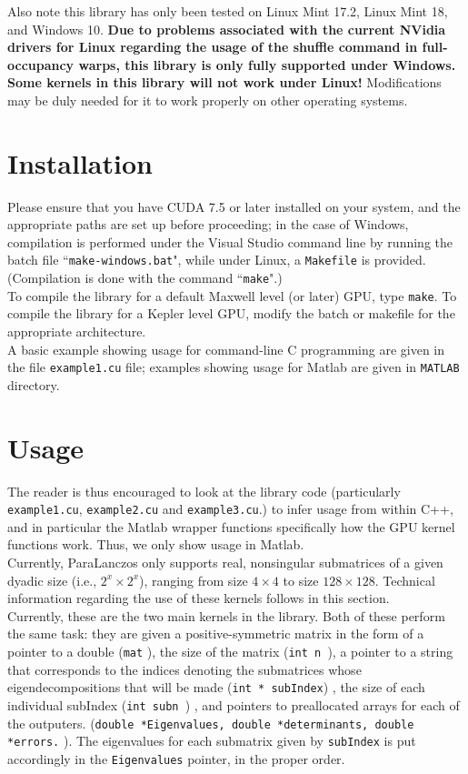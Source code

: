 \documentclass{amsart}
\begin{document}
 Also note this library has only been tested on Linux Mint 17.2, Linux Mint 18, and Windows 10.  \textbf{Due to problems associated with the current NVidia drivers for Linux regarding the usage of the shuffle command in full-occupancy warps, this library is only fully supported under Windows.  Some kernels in this library will not work under Linux!}  Modifications may be duly needed for it to work properly on other operating systems.

\section{Installation}

Please ensure that you have CUDA 7.5 or later installed on your system, and the appropriate paths are set up before proceeding;  in the case of Windows, compilation is performed under the Visual Studio command line by running the batch file ``{\tt make-windows.bat}", while under Linux, a {\tt Makefile} is provided.  (Compilation is done with the command ``{\tt make}".) \\

To compile the library for a default Maxwell level (or later) GPU, type {\tt make}.  To compile the library for a Kepler level GPU, modify the batch or makefile for the appropriate architecture.  \\

A basic example showing usage for command-line C programming are given in the file {\tt example1.cu} file;  examples showing usage for Matlab are given in {\tt MATLAB} directory.

\section{Usage}

The reader is thus encouraged to look at the library code (particularly {\tt example1.cu},  {\tt example2.cu} and {\tt example3.cu}.) to infer usage from within C++, and in particular the Matlab wrapper functions specifically how the GPU kernel functions work. Thus, we only show usage in Matlab.\\

Currently, ParaLanczos only supports real, nonsingular submatrices of a given dyadic size (i.e., $2^x \times 2^x$), ranging from size $4 \times 4$ to size $128 \times 128$.  Technical information regarding the use of these kernels follows in this section.\\

Currently, these are the two main kernels in the library.  Both of these perform the same task:  they are given a positive-symmetric matrix in the form of a pointer to a double ({\tt * mat} ), the size of the matrix ({\tt int n }), a pointer to a string that corresponds to the indices denoting the submatrices whose eigendecompositions that will be made ({\tt int * subIndex}) , the size of each individual subIndex ({\tt int subn }) , and pointers to preallocated arrays for each of the outputers.  ({\tt double *Eigenvalues, double *determinants, double *errors.} ).  The eigenvalues for each submatrix given by {\tt subIndex} is put accordingly in the {\tt Eigenvalues} pointer, in the proper order.  \\
\end{document}

